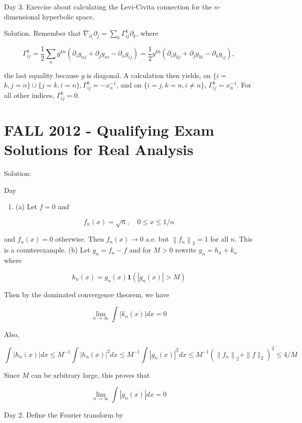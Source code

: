 \documentclass[10pt]{article}
\begin{document}
Day 3. Exercise about calculating the Levi-Civita connection for the $n$-dimensional hyperbolic space.

Solution. Remember that $\nabla_{\partial_{i}} \partial_{j}=\sum_{k} \Gamma_{i j}^{k} \partial_{k}$, where

$$
\Gamma_{i j}^{k}=\frac{1}{2} \sum_{n} g^{k n}\left(\partial_{i} g_{n j}+\partial_{j} g_{n i}-\partial_{n} g_{i j}\right)=\frac{1}{2} g^{k k}\left(\partial_{i} g_{k j}+\partial_{j} g_{k i}-\partial_{k} g_{i j}\right),
$$

the last equality because $g$ is diagonal. A calculation then yields, on $\{i=$ $k, j=n\} \cup\{j=k, i=n\}, \Gamma_{i j}^{k}=-x_{n}^{-1}$, and on $\{i=j, k=n, i \neq n\}$, $\Gamma_{i j}^{k}=x_{n}^{-1}$. For all other indices, $\Gamma_{i j}^{k}=0$.

\section{FALL 2012 - Qualifying Exam Solutions for Real Analysis}
Solution:

Day

\begin{enumerate}
  \item (a) Let $f=0$ and
\end{enumerate}

$$
f_{n}(x)=\sqrt{n}, \quad 0 \leq x \leq 1 / n
$$

and $f_{n}(x)=0$ otherwise. Then $f_{n}(x) \rightarrow 0$ a.e. but $\left\|f_{n}\right\|_{2}=1$ for all $n$. This is a counterexample. (b) Let $g_{n}=f_{n}-f$ and for $M>0$ rewrite $g_{n}=h_{n}+k_{n}$ where

$$
h_{n}(x)=g_{n}(x) \mathbf{1}\left(\left|g_{n}(x)\right|>M\right)
$$

Then by the dominated convergence theorem, we have

$$
\lim _{n \rightarrow \infty} \int\left|k_{n}(x)\right| d x=0
$$

Also,

$$
\int\left|h_{n}(x)\right| d x \leq M^{-1} \int\left|h_{n}(x)\right|^{2} d x \leq M^{-1} \int\left|g_{n}(x)\right|^{2} d x \leq M^{-1}\left(\left\|f_{n}\right\|_{2}+\|f\|_{2}\right)^{2} \leq 4 / M
$$

Since $M$ can be arbitrary large, this proves that

$$
\lim _{n \rightarrow \infty} \int\left|g_{n}(x)\right| d x=0
$$

Day 2. Define the Fourier transform by
\end{document}
